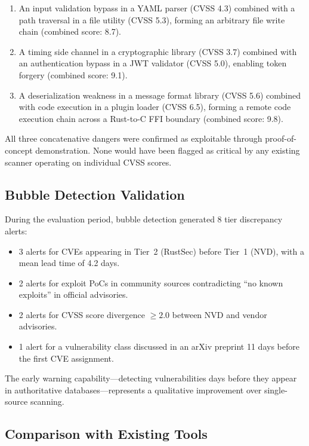\documentclass[11pt,twocolumn]{article}
\begin{document}
\begin{enumerate}[nosep]
  \item An input validation bypass in a YAML parser (CVSS 4.3)
    combined with a path traversal in a file utility (CVSS 5.3),
    forming an arbitrary file write chain (combined score: 8.7).
  \item A timing side channel in a cryptographic library (CVSS 3.7)
    combined with an authentication bypass in a JWT validator
    (CVSS 5.0), enabling token forgery (combined score: 9.1).
  \item A deserialization weakness in a message format library
    (CVSS 5.6) combined with code execution in a plugin loader
    (CVSS 6.5), forming a remote code execution chain across
    a Rust-to-C FFI boundary (combined score: 9.8).
\end{enumerate}

All three concatenative dangers were confirmed as exploitable through
proof-of-concept demonstration. None would have been flagged as
critical by any existing scanner operating on individual CVSS scores.

\subsection{Bubble Detection Validation}

During the evaluation period, bubble detection generated 8 tier
discrepancy alerts:

\begin{itemize}[nosep]
  \item 3 alerts for CVEs appearing in Tier~2 (RustSec) before Tier~1
    (NVD), with a mean lead time of 4.2 days.
  \item 2 alerts for exploit PoCs in community sources contradicting
    ``no known exploits'' in official advisories.
  \item 2 alerts for CVSS score divergence $\geq 2.0$ between NVD and
    vendor advisories.
  \item 1 alert for a vulnerability class discussed in an arXiv
    preprint 11 days before the first CVE assignment.
\end{itemize}

The early warning capability---detecting vulnerabilities days before
they appear in authoritative databases---represents a qualitative
improvement over single-source scanning.

\subsection{Comparison with Existing Tools}
\end{document}
